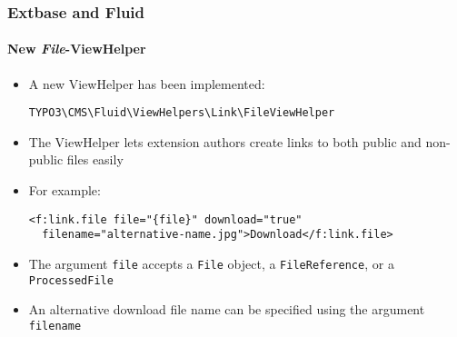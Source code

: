 %

\begin{frame}[fragile]
	\frametitle{Extbase and Fluid}
	\framesubtitle{New \textit{File}-ViewHelper}


	\begin{itemize}
		\item A new ViewHelper has been implemented:
\begin{lstlisting}
TYPO3\CMS\Fluid\ViewHelpers\Link\FileViewHelper
\end{lstlisting}

		\item The ViewHelper lets extension authors create links to both public
			and non-public files easily
		\item For example:

\begin{lstlisting}
<f:link.file file="{file}" download="true"
  filename="alternative-name.jpg">Download</f:link.file>
\end{lstlisting}

		\item The argument \texttt{file} accepts
			a \texttt{File} object,
			a \texttt{FileReference}, or
			a \texttt{ProcessedFile}
		\item An alternative download file name can be specified using the argument
			\texttt{filename}

	\end{itemize}

\end{frame}


